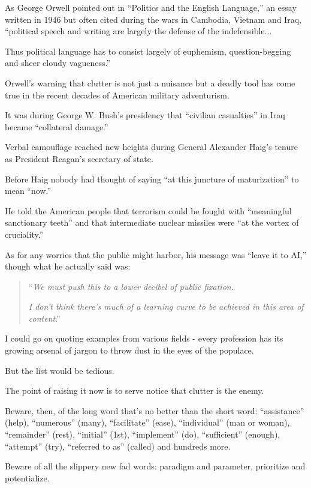 \documentclass{book}
\numberwithin{equation}{section}
\begin{document}
As George Orwell pointed out in ``Politics and the English Language,'' an essay written in 1946 but often cited during the wars in Cambodia, Vietnam and Iraq, ``political speech and writing are largely the defense of the indefensible$\ldots$

Thus political language has to consist largely of euphemism, question-begging and sheer cloudy vagueness.''

Orwell's warning that clutter is not just a nuisance but a deadly tool has come true in the recent decades of American military adventurism.

It was during George W. Bush's presidency that ``civilian casualties'' in Iraq became ``collateral damage.''

%
Verbal camouflage reached new heights during General Alexander Haig's tenure as President Reagan's secretary of state.

Before Haig nobody had thought of saying ``at this juncture of maturization'' to mean ``now.''

He told the American people that terrorism could be fought with ``meaningful sanctionary teeth'' and that intermediate nuclear missiles were ``at the vortex of cruciality.''

As for any worries that the public might harbor, his message was ``leave it to AI,'' though what he actually said was:
\begin{quotation}
    ``\textit{We must push this to a lower decibel of public fixation}.
    
    \textit{I don't think there's much of a learning curve to be achieved in this area of content}.''
\end{quotation}
%
I could go on quoting examples from various fields - every profession has its growing arsenal of jargon to throw dust in the eyes of the populace.

But the list would be tedious.

The point of raising it now is to serve notice that clutter is the enemy.

Beware, then, of the long word that's no better than the short word: ``assistance'' (help), ``numerous'' (many), ``facilitate'' (ease), ``individual'' (man or woman), ``remainder'' (rest), ``initial'' (1st), ``implement'' (do), ``sufficient'' (enough), ``attempt'' (try), ``referred to as'' (called) and hundreds more.

Beware of all the slippery new fad words: paradigm and parameter, prioritize and potentialize.
\end{document}
